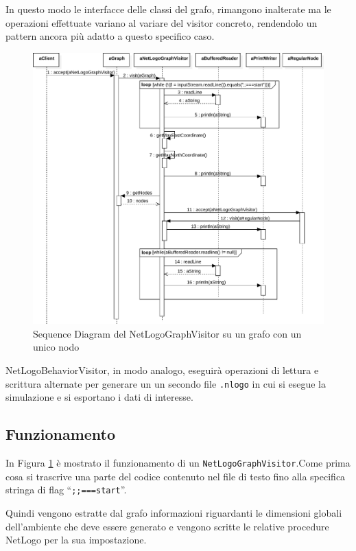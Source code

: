 In questo modo le interfacce delle classi del grafo, rimangono inalterate ma le operazioni effettuate variano al variare del visitor concreto, rendendolo un pattern ancora più adatto a questo specifico caso.

\begin{figure}[htbp]
\centering
\includegraphics[width=\textwidth,height=\textheight,keepaspectratio]{images/visitor-sequence.pdf}
\caption{Sequence Diagram del NetLogoGraphVisitor su un grafo con un unico nodo}
\label{fig:visitor-sequence}
\end{figure}
NetLogoBehaviorVisitor, in modo analogo, eseguirà operazioni di lettura e scrittura alternate per generare un un secondo file \texttt{.nlogo} in cui si esegue la simulazione e si esportano i dati di interesse.

\subsection{Funzionamento}
In Figura \ref{fig:visitor-sequence} è mostrato il funzionamento di un \texttt{NetLogoGraphVisitor}.Come prima cosa si trascrive una parte del codice contenuto nel file di testo fino alla specifica stringa di flag “\texttt{;;===start}”.

Quindi vengono estratte dal grafo informazioni riguardanti le dimensioni globali dell'ambiente che deve essere generato e vengono scritte le relative procedure NetLogo per la sua impostazione.

